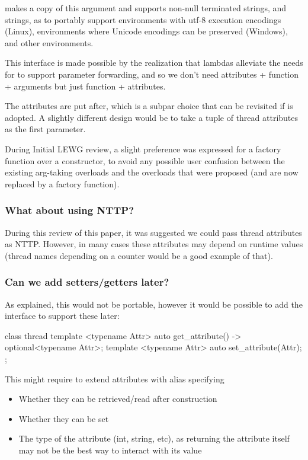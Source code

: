 \documentclass{wg21}
\begin{document}
 makes a copy of this argument and supports non-null terminated strings, and  strings, as to
portably support environments with utf-8 execution encodings (Linux), environments where Unicode encodings can be preserved (Windows),
and other environments.

This interface is made possible by the realization that lambdas alleviate the needs for  to support parameter forwarding,
and so we don't need attributes + function + arguments but just function + attributes.

The attributes are put after, which is a subpar choice that can be revisited if  is adopted.
A slightly different design would be to take a tuple of thread attributes as the first parameter.

During Initial LEWG review, a slight preference was expressed for a factory function over a constructor, to avoid any possible
user confusion between the existing arg-taking overloads and the overloads that were proposed (and are now replaced by a factory function).

\subsubsection{What about using NTTP?}

During this review of this paper, it was suggested we could pass thread attributes as NTTP.
However, in many cases these attributes may depend on runtime values (thread names depending on a counter would be a good example of that).

\subsubsection{Can we add setters/getters later?}

As explained, this would not be portable, however it would be possible to add the interface to support these later:

\begin{colorblock}
class thread {
          template <typename Attr>
          auto get_attribute() -> optional<typename Attr>;
          template <typename Attr>
          auto set_attribute(Attr);
};
\end{colorblock}


This might require to extend attributes with alias specifying
\begin{itemize}
	\item Whether they can be retrieved/read after construction
	\item Whether they can be set
	\item The type of the attribute (int, string, etc), as returning the attribute itself may not be the best way to interact with its value
\end{itemize}
\end{document}

